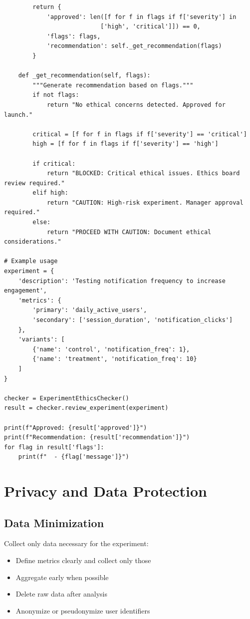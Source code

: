 \begin{lstlisting}
        return {
            'approved': len([f for f in flags if f['severity'] in
                           ['high', 'critical']]) == 0,
            'flags': flags,
            'recommendation': self._get_recommendation(flags)
        }

    def _get_recommendation(self, flags):
        """Generate recommendation based on flags."""
        if not flags:
            return "No ethical concerns detected. Approved for launch."

        critical = [f for f in flags if f['severity'] == 'critical']
        high = [f for f in flags if f['severity'] == 'high']

        if critical:
            return "BLOCKED: Critical ethical issues. Ethics board review required."
        elif high:
            return "CAUTION: High-risk experiment. Manager approval required."
        else:
            return "PROCEED WITH CAUTION: Document ethical considerations."

# Example usage
experiment = {
    'description': 'Testing notification frequency to increase engagement',
    'metrics': {
        'primary': 'daily_active_users',
        'secondary': ['session_duration', 'notification_clicks']
    },
    'variants': [
        {'name': 'control', 'notification_freq': 1},
        {'name': 'treatment', 'notification_freq': 10}
    ]
}

checker = ExperimentEthicsChecker()
result = checker.review_experiment(experiment)

print(f"Approved: {result['approved']}")
print(f"Recommendation: {result['recommendation']}")
for flag in result['flags']:
    print(f"  - {flag['message']}")
\end{lstlisting}

\section{Privacy and Data Protection}

\subsection{Data Minimization}

Collect only data necessary for the experiment:

\begin{itemize}
    \item Define metrics clearly and collect only those
    \item Aggregate early when possible
    \item Delete raw data after analysis
    \item Anonymize or pseudonymize user identifiers
\end{itemize}

